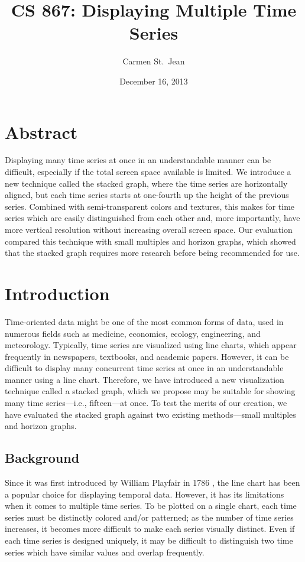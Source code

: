 \documentclass{article}
\begin{document}
\title{CS 867: Displaying Multiple Time Series}
\date{December 16, 2013}
\author{Carmen St.\ Jean}

\maketitle

\section{Abstract}

Displaying many time series at once in an understandable manner can be difficult, especially if the total screen space available is limited.  We introduce a new technique called the stacked graph, where the time series are horizontally aligned, but each time series starts at one-fourth up the height of the previous series.  Combined with semi-transparent colors and textures, this makes for time series which are easily distinguished from each other and, more importantly, have more vertical resolution without increasing overall screen space.  Our evaluation compared this technique with small multiples and horizon graphs, which showed that the stacked graph requires more research before being recommended for use.

\section{Introduction}

Time-oriented data might be one of the most common forms of data, used in numerous fields such as medicine, economics, ecology, engineering, and meteorology.  Typically, time series are visualized using line charts, which appear frequently in newspapers, textbooks, and academic papers.  However, it can be difficult to display many concurrent time series at once in an understandable manner using a line chart.  Therefore, we have introduced a new visualization technique called a stacked graph, which we propose may be suitable for showing many time series---i.e., fifteen---at once.  To test the merits of our creation, we have evaluated the stacked graph against two existing methods---small multiples and horizon graphs.

\subsection{Background}

Since it was first introduced by William Playfair in 1786 \cite{playfair1786}, the line chart has been a popular choice for displaying temporal data.  However, it has its limitations when it comes to multiple time series.  To be plotted on a single chart, each time series must be distinctly colored and/or patterned; as the number of time series increases, it becomes more difficult to make each series visually distinct.  Even if each time series is designed uniquely, it may be difficult to distinguish two time series which have similar values and overlap frequently.
\end{document}
